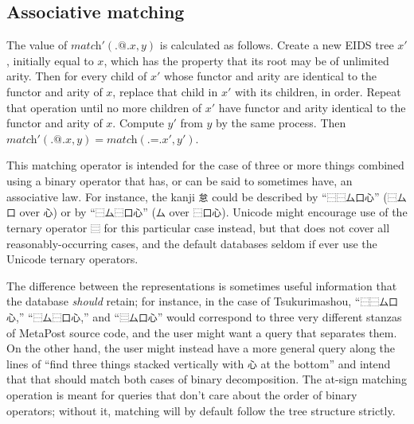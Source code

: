 \documentclass[twocolumn]{report}
\begin{document}
\subsection{Associative matching}

The value of $\textit{match}'(\texttt{.@.}x,y)$ is calculated as follows. 
Create a new EIDS tree $x'$, initially equal to $x$, which has the property
that its root may be of unlimited arity.  Then for every child of $x'$ whose
functor and arity are identical to the functor and arity of $x$, replace
that child in $x'$ with its children, in order.  Repeat that operation until
no more children of $x'$ have functor and arity identical to the
functor and arity of $x$.  Compute $y'$ from $y$ by the same process.  Then
$\textit{match}'(\texttt{.@.}x,y)=\textit{match}(\texttt{.=.}x',y')$.

This matching operator is intended for the case of three or more
things combined using a binary operator that has, or can be said to sometimes
have, an associative law.  For instance, the kanji \texttt{怠} could be
described by ``\texttt{⿱⿱厶口心}'' (\texttt{⿱厶口} over \texttt{心}) or
by ``\texttt{⿱厶⿱口心}'' (\texttt{厶} over \texttt{⿱口心}).  Unicode
might encourage use of the ternary operator \texttt{⿳} for this particular
case instead, but that does not cover all reasonably-occurring cases, and
the default databases seldom if ever use the Unicode ternary operators.

The difference between the representations is sometimes useful information
that the database \emph{should} retain; for instance, in the case of
Tsukurimashou, ``\texttt{⿱⿱厶口心},'' ``\texttt{⿱厶⿱口心},'' and
``\texttt{⿳厶口心}'' would correspond to three very different
stanzas of MetaPost source code, and the user might want a query
that separates them.  On the other hand, the user might instead have a more
general query along the lines of ``find three things stacked vertically with
\texttt{心} at the bottom'' and intend that that should match both cases of
binary decomposition.  The at-sign matching operation is meant for queries
that don't care about the order of binary operators; without it, matching
will by default follow the tree structure strictly.
\end{document}
